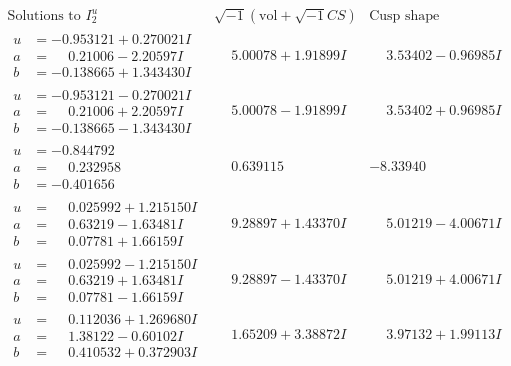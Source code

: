 \documentclass[1p]{elsarticle_modified}
\theoremstyle{definition}
\newcommand{\I}{\sqrt{-1}}
\begin{document}
$$\begin{array}{c|c|c}  
\text{Solutions to }I^u_{2}& \I (\text{vol} + \sqrt{-1}CS) & \text{Cusp shape}\\
 \hline 
\begin{aligned}
u &= -0.953121 + 0.270021 I \\
a &= \phantom{-}0.21006 - 2.20597 I \\
b &= -0.138665 + 1.343430 I\end{aligned}
 & \phantom{-}5.00078 + 1.91899 I & \phantom{-}3.53402 - 0.96985 I \\ \hline\begin{aligned}
u &= -0.953121 - 0.270021 I \\
a &= \phantom{-}0.21006 + 2.20597 I \\
b &= -0.138665 - 1.343430 I\end{aligned}
 & \phantom{-}5.00078 - 1.91899 I & \phantom{-}3.53402 + 0.96985 I \\ \hline\begin{aligned}
u &= -0.844792\phantom{ +0.000000I} \\
a &= \phantom{-}0.232958\phantom{ +0.000000I} \\
b &= -0.401656\phantom{ +0.000000I}\end{aligned}
 & \phantom{-}0.639115\phantom{ +0.000000I} & -8.33940\phantom{ +0.000000I} \\ \hline\begin{aligned}
u &= \phantom{-}0.025992 + 1.215150 I \\
a &= \phantom{-}0.63219 - 1.63481 I \\
b &= \phantom{-}0.07781 + 1.66159 I\end{aligned}
 & \phantom{-}9.28897 + 1.43370 I & \phantom{-}5.01219 - 4.00671 I \\ \hline\begin{aligned}
u &= \phantom{-}0.025992 - 1.215150 I \\
a &= \phantom{-}0.63219 + 1.63481 I \\
b &= \phantom{-}0.07781 - 1.66159 I\end{aligned}
 & \phantom{-}9.28897 - 1.43370 I & \phantom{-}5.01219 + 4.00671 I \\ \hline\begin{aligned}
u &= \phantom{-}0.112036 + 1.269680 I \\
a &= \phantom{-}1.38122 - 0.60102 I \\
b &= \phantom{-}0.410532 + 0.372903 I\end{aligned}
 & \phantom{-}1.65209 + 3.38872 I & \phantom{-}3.97132 + 1.99113 I \\ \hline\begin{aligned}

\end{aligned}
\end{array}$$
\end{document}
